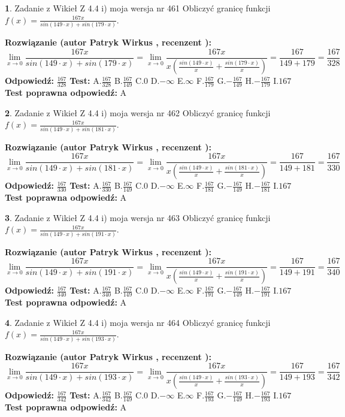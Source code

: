 \documentclass[12pt, a4paper]{article}
\theoremstyle{definition} %
\newtheorem{zad}{}
\newcommand{\zadStart}[1]{\begin{zad}#1\newline}
\newcommand{\zadStop}{\end{zad}}
\newcommand{\rozwStart}[2]{\noindent \textbf{Rozwiązanie (autor #1 , recenzent #2): }\newline}
\newcommand{\rozwStop}{\newline}
\newcommand{\odpStart}{\noindent \textbf{Odpowiedź:}\newline}
\newcommand{\odpStop}{\newline}
\newcommand{\testStart}{\noindent \textbf{Test:}\newline}
\newcommand{\testStop}{\newline}
\newcommand{\kluczStart}{\noindent \textbf{Test poprawna odpowiedź:}\newline}
\newcommand{\kluczStop}{\newline}
\begin{document}
\zadStart{Zadanie z Wikieł Z 4.4 i) moja wersja nr 461}
Obliczyć granicę funkcji $f(x)=\frac{167x}{sin(149\cdot x) +sin(179\cdot x)}$.
\zadStop
\rozwStart{Patryk Wirkus}{}
$$\lim\limits_{x\to 0}\frac{167x}{sin(149\cdot x) +sin(179\cdot x)}=\lim\limits_{x\to 0}\frac{167x}{x(\frac{sin(149\cdot x)}{x}+\frac{sin(179\cdot x)}{x})}=\frac{167}{149+179} = \frac{167}{328}$$
\rozwStop
\odpStart
$\frac{167}{328}$
\odpStop
\testStart
A.$\frac{167}{328}$
B.$\frac{167}{149}$
C.$0$
D.$-\infty$
E.$\infty$
F.$\frac{167}{179}$
G.$-\frac{167}{149}$
H.$-\frac{167}{179}$
I.$167$
\testStop
\kluczStart
A
\kluczStop



\zadStart{Zadanie z Wikieł Z 4.4 i) moja wersja nr 462}
Obliczyć granicę funkcji $f(x)=\frac{167x}{sin(149\cdot x) +sin(181\cdot x)}$.
\zadStop
\rozwStart{Patryk Wirkus}{}
$$\lim\limits_{x\to 0}\frac{167x}{sin(149\cdot x) +sin(181\cdot x)}=\lim\limits_{x\to 0}\frac{167x}{x(\frac{sin(149\cdot x)}{x}+\frac{sin(181\cdot x)}{x})}=\frac{167}{149+181} = \frac{167}{330}$$
\rozwStop
\odpStart
$\frac{167}{330}$
\odpStop
\testStart
A.$\frac{167}{330}$
B.$\frac{167}{149}$
C.$0$
D.$-\infty$
E.$\infty$
F.$\frac{167}{181}$
G.$-\frac{167}{149}$
H.$-\frac{167}{181}$
I.$167$
\testStop
\kluczStart
A
\kluczStop



\zadStart{Zadanie z Wikieł Z 4.4 i) moja wersja nr 463}
Obliczyć granicę funkcji $f(x)=\frac{167x}{sin(149\cdot x) +sin(191\cdot x)}$.
\zadStop
\rozwStart{Patryk Wirkus}{}
$$\lim\limits_{x\to 0}\frac{167x}{sin(149\cdot x) +sin(191\cdot x)}=\lim\limits_{x\to 0}\frac{167x}{x(\frac{sin(149\cdot x)}{x}+\frac{sin(191\cdot x)}{x})}=\frac{167}{149+191} = \frac{167}{340}$$
\rozwStop
\odpStart
$\frac{167}{340}$
\odpStop
\testStart
A.$\frac{167}{340}$
B.$\frac{167}{149}$
C.$0$
D.$-\infty$
E.$\infty$
F.$\frac{167}{191}$
G.$-\frac{167}{149}$
H.$-\frac{167}{191}$
I.$167$
\testStop
\kluczStart
A
\kluczStop



\zadStart{Zadanie z Wikieł Z 4.4 i) moja wersja nr 464}
Obliczyć granicę funkcji $f(x)=\frac{167x}{sin(149\cdot x) +sin(193\cdot x)}$.
\zadStop
\rozwStart{Patryk Wirkus}{}
$$\lim\limits_{x\to 0}\frac{167x}{sin(149\cdot x) +sin(193\cdot x)}=\lim\limits_{x\to 0}\frac{167x}{x(\frac{sin(149\cdot x)}{x}+\frac{sin(193\cdot x)}{x})}=\frac{167}{149+193} = \frac{167}{342}$$
\rozwStop
\odpStart
$\frac{167}{342}$
\odpStop
\testStart
A.$\frac{167}{342}$
B.$\frac{167}{149}$
C.$0$
D.$-\infty$
E.$\infty$
F.$\frac{167}{193}$
G.$-\frac{167}{149}$
H.$-\frac{167}{193}$
I.$167$
\testStop
\kluczStart
A
\kluczStop
\end{document}
